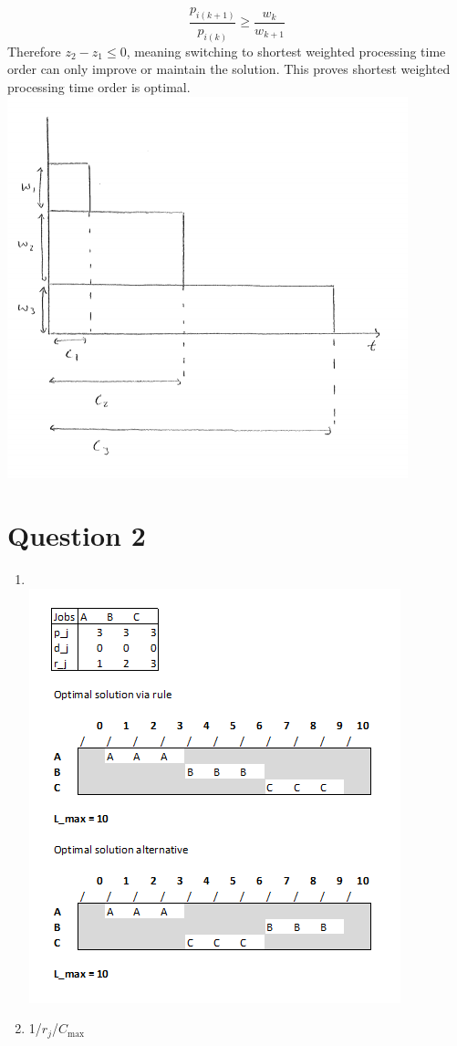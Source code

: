 \documentclass[10pt,a4paper]{article}
\begin{document}
\begin{equation*}
	\frac{p_{i(k+1)}}{p_{i(k)}} \geq \frac{w_k}{w_{k+1}}
\end{equation*}
Therefore \(z_2 - z_1 \leq 0\), meaning switching to shortest weighted processing time order can only improve or maintain the solution.  This proves shortest weighted processing time order is optimal.\\
\includegraphics[width=0.7\linewidth]{q1}
\section*{Question 2}
\begin{enumerate}
	\item \text{}\\
	\includegraphics[width=0.7\linewidth]{q2}

	
	\item 1/\(r_j\)/\(C_\text{max}\)
\end{enumerate}
\end{document}
